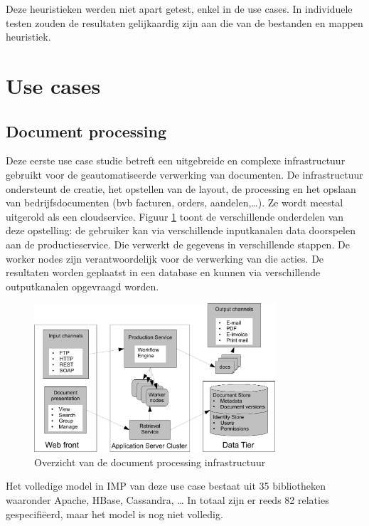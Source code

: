 Deze heuristieken werden niet apart getest, enkel in de use cases.
In individuele testen zouden de resultaten gelijkaardig zijn aan die van de bestanden en mappen heuristiek.

\section{Use cases}

\subsection{Document processing}
Deze eerste use case studie betreft een uitgebreide en complexe infrastructuur gebruikt voor de geautomatiseerde verwerking van documenten.
De infrastructuur ondersteunt  de creatie, het opstellen van de layout, de processing en het opslaan van bedrijfsdocumenten (bvb facturen, orders, aandelen,\ldots).
Ze wordt meestal uitgerold als een cloudservice.
Figuur \ref{fig:doc_processing} toont de verschillende onderdelen van deze opstelling:
de gebruiker kan via verschillende inputkanalen data doorspelen aan de productieservice.
Die verwerkt de gegevens in verschillende stappen.
De worker nodes zijn verantwoordelijk voor de verwerking van die acties.
De resultaten worden geplaatst in een database en kunnen via verschillende outputkanalen opgevraagd worden.

\begin{figure}[h]
    \begin{center}
    \includegraphics[width=0.8\textwidth]{images/doc_processing.pdf}
    \caption{Overzicht van de document processing infrastructuur}
    \label{fig:doc_processing}
    \end{center}
\end{figure}

Het volledige model in IMP van deze use case bestaat uit 35 bibliotheken  waaronder Apache, HBase, Cassandra, \ldots
In totaal zijn er reeds 82 relaties gespecifi\"eerd, maar het model is nog niet volledig.

